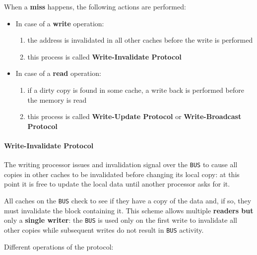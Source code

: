 \documentclass[english]{article}
\begin{document}
\bigskip
When a \textbf{miss} happens, the following actions are performed:

\begin{itemize}
  \item In case of a \textbf{write} operation:
        \begin{enumerate}
          \item the address is invalidated in all other caches before the write is performed
          \item this process is called \textbf{Write-Invalidate Protocol}
        \end{enumerate}
  \item In case of a \textbf{read} operation:
        \begin{enumerate}
          \item if a dirty copy is found in some cache, a write back is performed before the memory is read
          \item this process is called \textbf{Write-Update Protocol} or \textbf{Write-Broadcast Protocol}
        \end{enumerate}
\end{itemize}

\paragraph{Write-Invalidate Protocol}

The writing processor issues and invalidation signal over the \texttt{BUS} to cause all copies in other caches to be invalidated before changing its local copy:
at this point it is free to update the local data until another processor asks for it.

All caches on the \texttt{BUS} check to see if they have a copy of the data and, if so, they must invalidate the block containing it.
This scheme allows multiple \textbf{readers but} only a \textbf{single writer}: the \texttt{BUS} is used only on the first write to invalidate all other copies while subsequent writes do not result in \texttt{BUS} activity.

\bigskip
Different operations of the protocol:
\end{document}
